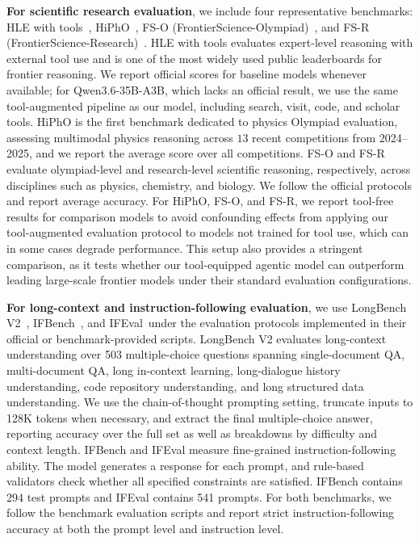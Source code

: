 \documentclass{llmxive}
\begin{document}
\textbf{For scientific research evaluation}, we include four representative benchmarks: HLE with tools~\citep{phan2025humanity}, HiPhO~\citep{hipho}, FS-O (FrontierScience-Olympiad)~\citep{frontierscience}, and FS-R (FrontierScience-Research)~\citep{frontierscience}. HLE with tools evaluates expert-level reasoning with external tool use and is one of the most widely used public leaderboards for frontier reasoning. We report official scores for baseline models whenever available; for Qwen3.6-35B-A3B, which lacks an official result, we use the same tool-augmented pipeline as our model, including search, visit, code, and scholar tools. HiPhO is the first benchmark dedicated to physics Olympiad evaluation, assessing multimodal physics reasoning across $13$ recent competitions from 2024--2025, and we report the average score over all competitions. FS-O and FS-R evaluate olympiad-level and research-level scientific reasoning, respectively, across disciplines such as physics, chemistry, and biology. We follow the official protocols and report average accuracy. For HiPhO, FS-O, and FS-R, we report tool-free results for comparison models to avoid confounding effects from applying our tool-augmented evaluation protocol to models not trained for tool use, which can in some cases degrade performance. This setup also provides a stringent comparison, as it tests whether our tool-equipped agentic model can outperform leading large-scale frontier models under their standard evaluation configurations.

\textbf{For long-context and instruction-following evaluation}, we use LongBench V2~\citep{LongBench}, IFBench~\citep{IFBench}, and IFEval~\citep{zhou2023ifeval}under the evaluation protocols implemented in their official or benchmark-provided scripts. LongBench V2 evaluates long-context understanding over 503 multiple-choice questions spanning single-document QA, multi-document QA, long in-context learning, long-dialogue history understanding, code repository understanding, and long structured data understanding. We use the chain-of-thought prompting setting, truncate inputs to 128K tokens when necessary, and extract the final multiple-choice answer, reporting accuracy over the full set as well as breakdowns by difficulty and context length. IFBench and IFEval measure fine-grained instruction-following ability. The model generates a response for each prompt, and rule-based validators check whether all specified constraints are satisfied. IFBench contains 294 test prompts and IFEval contains 541 prompts. For both benchmarks, we follow the benchmark evaluation scripts and report strict instruction-following accuracy at both the prompt level and instruction level.
\end{document}
